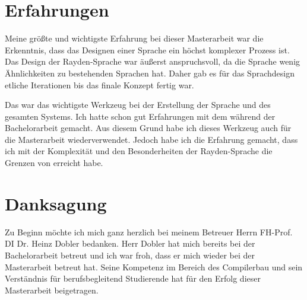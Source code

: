 \section{Erfahrungen}

Meine größte und wichtigste Erfahrung bei dieser Masterarbeit war die Erkenntnis, dass das Designen einer Sprache ein höchst komplexer Prozess ist. Das Design der Rayden-Sprache war äußerst anspruchsvoll, da die Sprache wenig Ähnlichkeiten zu bestehenden Sprachen hat. Daher gab es für das Sprachdesign etliche Iterationen bis das finale Konzept fertig war.

\SuperPar
Das  war das wichtigste Werkzeug bei der Erstellung der Sprache und des gesamten Systems. Ich hatte schon gut Erfahrungen mit dem  während der Bachelorarbeit gemacht. Aus diesem Grund habe ich dieses Werkzeug auch für die Masterarbeit wiederverwendet. Jedoch habe ich die Erfahrung gemacht, dass ich mit der Komplexität und den Besonderheiten der Rayden-Sprache die Grenzen von  erreicht habe.

\section{Danksagung}

Zu Beginn möchte ich mich ganz herzlich bei meinem Betreuer Herrn FH-Prof. DI Dr. Heinz Dobler bedanken. Herr Dobler hat mich bereits bei der Bachelorarbeit betreut und ich war froh, dass er mich wieder bei der Masterarbeit betreut hat. Seine Kompetenz im Bereich des Compilerbau und sein Verständnis für berufsbegleitend Studierende hat für den Erfolg dieser Masterarbeit beigetragen. 






\todo
